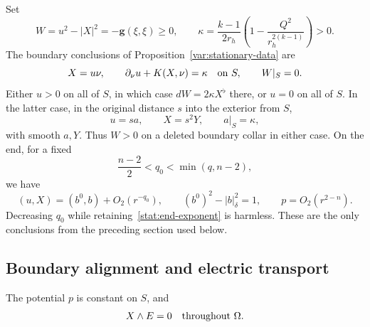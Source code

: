 Set
\begin{equation}
 W=u^2-|X|^2=-\mathbf g(\xi,\xi)\geq0,
 \qquad
 \kappa=\frac{k-1}{2r_h}
       \left(1-\frac{Q^2}{r_h^{2(k-1)}}\right)>0.
 \label{stat:W-kappa}
\end{equation}
The boundary conclusions of Proposition~\ref{var:stationary-data} are
\begin{equation}
 X=u\nu,\qquad
 \partial_\nu u+K(X,\nu)=\kappa\quad\hbox{on }S,
 \qquad W|_S=0.
 \label{stat:boundary-laws}
\end{equation}
Either $u>0$ on all of $S$, in which case
$dW=2\kappa X^\flat$ there, or $u=0$ on all of $S$.  In the latter
case, in the original distance $s$ into the exterior from $S$,
\begin{equation}
 u=s a,\qquad X=s^2Y,\qquad a|_S=\kappa,
 \label{stat:zero-lapse-factors}
\end{equation}
with smooth $a,Y$.  Thus $W>0$ on a deleted boundary collar in either
case.  On the end, for a fixed
\begin{equation}
 \frac{n-2}{2}<q_0<\min(q,n-2),
 \label{stat:end-exponent}
\end{equation}
we have
\begin{equation}
 (u,X)=(b^0,b)+O_2(r^{-q_0}),\qquad
 (b^0)^2-|b|_\delta^2=1,\qquad
 p=O_2(r^{2-n}).
 \label{stat:end-interface}
\end{equation}
Decreasing $q_0$ while retaining~\eqref{stat:end-exponent} is harmless.
These are the only conclusions from the preceding section used below.

\subsection{Boundary alignment and electric transport}

\begin{lemma}
\label{stat:electric-alignment}
The potential $p$ is constant on $S$, and
\begin{equation}
 X\wedge E=0\quad\hbox{throughout }\Omega.
 \label{stat:alignment}
\end{equation}
\end{lemma}

